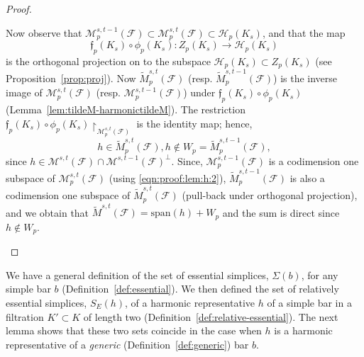 \documentclass[11pt]{amsart}
\theoremstyle{theorem}
\theoremstyle{remark}
\theoremstyle{definition}
\begin{document}
\begin{proof}
\begin{enumerate}
     
    Now observe that
    $\mathcal{M}_p^{s,t-1}(\mathcal{F}) \subset \mathcal{M}_p^{s,t}(\mathcal{F}) \subset \mathcal{H}_p(K_s)$, and 
    that the map 
    \[
    \mathfrak{f}_p(K_s) \circ \phi_p(K_s): Z_p(K_s) \rightarrow \mathcal{H}_p(K_s)
    \]
    is the orthogonal projection on to the subspace 
    $\mathcal{H}_p(K_s) \subset Z_p(K_s)$ (see Proposition~\ref{prop:proj}).
    Now $\widetilde{M}^{s,t}_p(\mathcal{F})$ (resp. $\widetilde{M}^{s,t-1}_p(\mathcal{F})$) is the inverse image 
    of $\mathcal{M}^{s,t}_p(\mathcal{F})$ (resp. $\mathcal{M}^{s,t-1}_p(\mathcal{F})$) under $\mathfrak{f}_p(K_s) \circ \phi_p(K_s)$ (Lemma~\ref{lem:tildeM-harmonictildeM}). The restriction $\mathfrak{f}_p(K_s) \circ \phi_p(K_s)\restriction_{\mathcal{M}^{s,t}_p(\mathcal{F})}$ is the identity map; hence,
    \[
    h \in \widetilde{M}^{s,t}_p(\mathcal{F}), h \not\in  W_p = \widetilde{M}^{s,t-1}_p(\mathcal{F}),
    \]
    since $h \in \mathcal{M}^{s,t}(\mathcal{F}) \cap \mathcal{M}^{s,t-1}(\mathcal{F})^\perp$.
    Since,
    $\mathcal{M}^{s,t-1}_p(\mathcal{F})$ is a codimension one subspace of $\mathcal{M}^{s,t}_p(\mathcal{F})$ (using \eqref{eqn:proof:lem:h:2}),
    $\widetilde{M}^{s,t-1}_p(\mathcal{F})$ is also a codimension one subspace of $\widetilde{M}^{s,t}_p(\mathcal{F})$ (pull-back under orthogonal projection), and we obtain that
    $\widetilde{M}^{s,t}(\mathcal{F}) = \mathrm{span}(h) + W_p$ and the sum is direct since $h \not\in W_p$.
\end{enumerate}
\end{proof}


We have a general definition of the set of essential simplices, $\Sigma(b)$, for any simple bar $b$ (Definition~\ref{def:essential}). We then defined the set of relatively essential simplices, $S_E(h)$, of a harmonic representative $h$ of a simple bar in a filtration $K' \subset K$ of length two (Definition~\ref{def:relative-essential}). 
The next lemma shows that these two sets coincide in the case when $h$ is a harmonic representative of a \emph{generic} (Definition~\ref{def:generic}) bar $b$.
\end{document}
